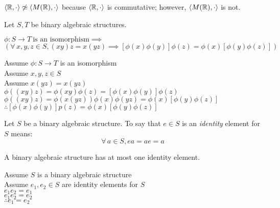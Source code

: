 \documentclass[letterpaper,12pt,fleqn]{article}
\newcommand{\p}{\phi}
\newcommand{\bas}[2]{\left<#1,#2\right>}
\begin{document}
\begin{example}
  $\bas{\R}{\cdot}\not\simeq\bas{M(\R)}{\cdot}$ because $\bas{\R}{\cdot}$ is
  commutative; however, $\bas{M(\R)}{\cdot}$ is not.
\end{example}

\begin{theorem}
  Let $S,T$ be binary algebraic structures.
  
  $\p:S\to T\ \mbox{is an isomorphism}\implies$
  \[\left(\forall\,x,y,z\in S, (xy)z=x(yz)\implies
  [\p(x)\p(y)]\p(z)=\p(x)[\p(y)\p(z)]\right)\]
\end{theorem}

\begin{theproof}
  Assume $\p:S\to T$ is an isomorphism \\
  Assume $x,y,z\in S$ \\
  Assume $x(yz)=x(yz)$ \\
  $\p((xy)z)=\p(xy)\p(z)=[\p(x)\p(y)]\p(z)$ \\
  $\p((xy)z)=\p(x(yz))\p(x)\p(yz)=\p(x)[\p(y)\p(z)]$ \\
  $\therefore [\p(x)\p(y)]p(z)=\p(x)[\p(y)\p(z)]$
\end{theproof}

\begin{definition}
  Let $S$ be a binary algebraic structure. To say that $e\in S$ is an
  \emph{identity} element for $S$ means:
  \[\forall\,a\in S,ea=ae=a\]
\end{definition}

\begin{theorem}
  A binary algebraic structure has at most one identity element.
\end{theorem}

\begin{theproof}
  Assume $S$ is a binary algebraic structure \\
  Assume $e_1,e_2\in S$ are identity elements for $S$ \\
  $e_1e_2=e_1$ \\
  $e_1e_2=e_2$ \\
  $\therefore e_1=e_2$
\end{theproof}
\end{document}

